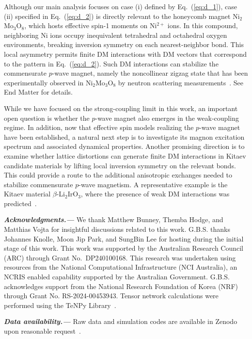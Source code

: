 \documentclass[aps,prl,twocolumn,showpacs,superscriptaddress]{revtex4-2}
\begin{document}
Although our main analysis focuses on case (i) defined by Eq.~(\ref{eq:d_1}), case (ii) specified in Eq.~(\ref{eq:d_2}) is directly relevant  to the honeycomb magnet Ni$_2$Mo$_3$O$_8$, which hosts effective spin-1 moments on Ni$^{2+}$ ions. In this compound, neighboring Ni ions occupy inequivalent tetrahedral and octahedral oxygen environments, breaking inversion symmetry on each nearest-neighbor bond.\cite{morey2019n, PhysRevResearch.5.033099} This local asymmetry permits finite DM interactions with DM vectors that correspond to the pattern in Eq.~(\ref{eq:d_2}).\cite{gao2023diffusive} Such DM interactions can stabilize the commensurate $p$-wave magnet, namely the noncollinear zigzag state that has been experimentally observed in Ni$_2$Mo$_3$O$_8$ by neutron scattering measurements~\cite{gao2023diffusive}. See End Matter for details.

While we have focused on the strong-coupling limit in this work, an important open question is whether the $p$-wave magnet also emerges in the weak-coupling regime. In addition, now that effective spin models realizing the $p$-wave magnet have been established, a natural next step is to investigate its magnon excitation spectrum and associated dynamical properties. Another promising direction is to examine whether lattice distortions can generate finite DM interactions in Kitaev candidate materials by lifting local inversion symmetry on the relevant bonds. This could provide a route to the additional anisotropic exchanges needed to stabilize commensurate $p$-wave magnetism. A representative example is the Kitaev material $\beta$-Li$_2$IrO$_3$, where the presence of weak DM interactions was predicted~\cite{yadav2018strain}.

\textbf{\textit{Acknowledgments.---}}
We thank Matthew Bunney, Themba Hodge, and Matthias Vojta for insightful discussions related to this work. G.B.S. thanks Johannes Knolle, Moon Jip Park, and SungBin Lee for hosting during the initial stage of this work. This work was supported by the Australian Research Council (ARC) through Grant No.\ DP240100168. This research was undertaken using resources from the National Computational Infrastructure (NCI Australia), an NCRIS enabled capability supported by the Australian Government. G.B.S. acknowledges support from the National Research Foundation of Korea (NRF) through Grant No. RS-2024-00453943. Tensor network calculations were performed using the TeNPy Library~\cite{10.21468/SciPostPhysLectNotes.5,10.21468/SciPostPhysCodeb.41}.

\textbf{\textit{Data availability.---}}
Raw data and simulation codes are available in Zenodo upon reasonable request~\cite{data_zenodo}.
\end{document}
